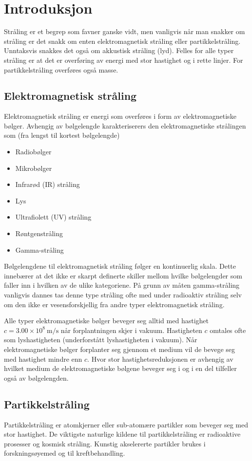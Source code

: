 \documentclass[a4paper,norsk,12pt]{book}
\begin{document}
\tableofcontents

\chapter{Introduksjon}
Stråling er et begrep som favner ganske vidt, men vanligvis når man snakker om stråling er det snakk om enten elektromagnetisk stråling eller partikkelstråling. Unntaksvis snakkes det også om akkustisk stråling (lyd). Felles for alle typer stråling er at det er overføring av energi med stor hastighet og i rette linjer. For partikkelstråling overføres også masse.

\section{Elektromagnetisk stråling}
Elektromagnetisk stråling er energi som overføres i form av elektromagnetiske bølger. Avhengig av bølgelengde karakteriserers den elektromagnetiske strålingen som (fra lengst til kortest bølgelengde)
\begin{itemize}
	\item Radiobølger
	\item Mikrobølger
	\item Infrarød (IR) stråling
	\item Lys
	\item Ultrafiolett (UV) stråling
	\item Røntgenstråling
	\item Gamma-stråling
\end{itemize}
Bølgelengdene til elektromagnetisk stråling følger en kontinuerlig skala. Dette innebærer at det ikke er skarpt definerte skiller mellom hvilke bølgelengder som faller inn i hvilken av de ulike kategoriene. På grunn av måten gamma-stråling vanligvis dannes tas denne type stråling ofte med under radioaktiv stråling selv om den ikke er vesensforskjellig fra andre typer elektromagnetisk stråling.

Alle typer elektromagnetiske bølger beveger seg alltid med hastighet $c = 3.00\times10^8~\mathrm{m/s}$ når forplantningen skjer i vakuum. Hastigheten $c$ omtales ofte som lyshastigheten (underforstått lyshastigheten i vakuum). Når elektromagnetiske bølger forplanter seg gjennom et medium vil de bevege seg med hastighet mindre enn $c$. Hvor stor hastighetsreduksjonen  er avhengig av hvilket medium de elektromagnetiske bølgene beveger seg i og i en del tilfeller også av bølgelengden.

\section{Partikkelstråling}
Partikkelstråling er atomkjerner eller sub-atomære partikler som beveger seg med stor hastighet. De viktigste naturlige kildene til partikkelstråling er radioaktive prosesser og kosmisk stråling. Kunstig akselererte partikler brukes i forskningsøyemed og til kreftbehandling.
\end{document}
